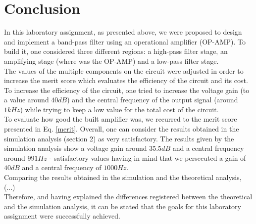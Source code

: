 \section{Conclusion}
In this laboratory assignment, as presented above, we were proposed to design and implement a band-pass filter using an operational amplifier (OP-AMP). To build it, one considered three different regions: a high-pass filter stage, an amplifying stage (where was the OP-AMP) and a low-pass filter stage. \\

The values of the multiple components on the circuit were adjusted in order to increase the merit score which evaluates the efficiency of the circuit and its cost. To increase the efficiency of the circuit, one tried to increase the voltage gain (to a value around $40dB$) and the central frequency of the output signal (around $1kHz$) while trying to keep a low value for the total cost of the circuit. \\

To evaluate how good the built amplifier was, we recurred to the merit score presented in Eq. \eqref{merit}. Overall, one can consider the results obtained in the simulation analysis (section 2) as very satisfactory. The results given by the simulation analysis show a voltage gain around $35.5 dB$ and a central frequency around $991Hz$ - satisfactory values having in mind that we persecuted a gain of $40dB$ and a central frequency of $1000Hz$.\\

Comparing the results obtained in the simulation and the theoretical analysis, (...)\\

Therefore, and having explained the differences registered between the theoretical and the simulation analysis, it can be stated that the goals for this laboratory assignment were successfully achieved.